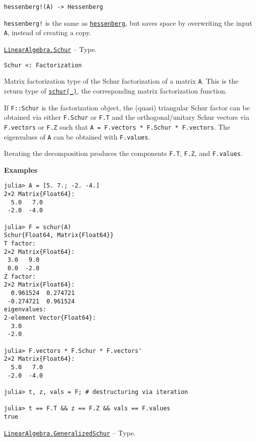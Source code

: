 \begin{adjustwidth}{2em}{0pt}


\begin{verbatim}
hessenberg!(A) -> Hessenberg
\end{verbatim}

\texttt{hessenberg!} is the same as \hyperlink{14451165250498024497}{\texttt{hessenberg}}, but saves space by overwriting the input \texttt{A}, instead of creating a copy.



\end{adjustwidth}
\hypertarget{9412476259327688170}{}
\hyperlink{9412476259327688170}{\texttt{LinearAlgebra.Schur}}  -- {Type.}

\begin{adjustwidth}{2em}{0pt}


\begin{verbatim}
Schur <: Factorization
\end{verbatim}

Matrix factorization type of the Schur factorization of a matrix \texttt{A}. This is the return type of \hyperlink{17132870828407138368}{\texttt{schur(\_)}}, the corresponding matrix factorization function.

If \texttt{F::Schur} is the factorization object, the (quasi) triangular Schur factor can be obtained via either \texttt{F.Schur} or \texttt{F.T} and the orthogonal/unitary Schur vectors via \texttt{F.vectors} or \texttt{F.Z} such that \texttt{A = F.vectors * F.Schur * F.vectors{\textquotesingle}}. The eigenvalues of \texttt{A} can be obtained with \texttt{F.values}.

Iterating the decomposition produces the components \texttt{F.T}, \texttt{F.Z}, and \texttt{F.values}.

\textbf{Examples}


\begin{verbatim}
julia> A = [5. 7.; -2. -4.]
2×2 Matrix{Float64}:
  5.0   7.0
 -2.0  -4.0

julia> F = schur(A)
Schur{Float64, Matrix{Float64}}
T factor:
2×2 Matrix{Float64}:
 3.0   9.0
 0.0  -2.0
Z factor:
2×2 Matrix{Float64}:
  0.961524  0.274721
 -0.274721  0.961524
eigenvalues:
2-element Vector{Float64}:
  3.0
 -2.0

julia> F.vectors * F.Schur * F.vectors'
2×2 Matrix{Float64}:
  5.0   7.0
 -2.0  -4.0

julia> t, z, vals = F; # destructuring via iteration

julia> t == F.T && z == F.Z && vals == F.values
true
\end{verbatim}



\end{adjustwidth}
\hypertarget{6518772096850576950}{}
\hyperlink{6518772096850576950}{\texttt{LinearAlgebra.GeneralizedSchur}}  -- {Type.}


